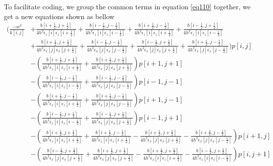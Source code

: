 \documentclass[revised,endfloat]{geophysics}
\begin{document}
To facilitate coding, we group the common terms in equation \ref{eq110} together, we get a new equations shown as bellow
\begin{equation}
\begin{split}
(\frac{-w^2}{k[i,j]} &+ \frac{b[i+\frac{1}{2}, j+\frac{1}{2}]}{4h^2 \epsilon_z[i] \epsilon_z[i+\frac{1}{2}]} + \frac{b[i-\frac{1}{2}, j-\frac{1}{2}]}{4h^2 \epsilon_z[i] \epsilon_z[i-\frac{1}{2}]} + \frac{b[i+\frac{1}{2}, j-\frac{1}{2}]}{4h^2 \epsilon_z[i] \epsilon_z[i+\frac{1}{2}]} + \frac{b[i-\frac{1}{2}, j+\frac{1}{2}]}{4h^2 \epsilon_z[i] \epsilon_z[i-\frac{1}{2}]} \\
                          &+ \frac{b[i+\frac{1}{2}, j+\frac{1}{2}]}{4h^2 \epsilon_x[j] \epsilon_x[j+\frac{1}{2}]} + \frac{b[i-\frac{1}{2}, j-\frac{1}{2}]}{4h^2 \epsilon_x[j] \epsilon_x[j-\frac{1}{2}]} + \frac{b[i-\frac{1}{2}, j+\frac{1}{2}]}{4h^2 \epsilon_x[j] \epsilon_x[j+\frac{1}{2}]} + \frac{b[i+\frac{1}{2}, j-\frac{1}{2}]}{4h^2 \epsilon_x[j] \epsilon_x[j-\frac{1}{2}]} ) p[i,j] \\
                          &- (\frac{b[i+\frac{1}{2}, j+\frac{1}{2}]}{4h^2 \epsilon_z[i] \epsilon_z[i+\frac{1}{2}]} + \frac{b[i+\frac{1}{2}, j+\frac{1}{2}]}{4h^2 \epsilon_x[j] \epsilon_x[j+\frac{1}{2}]}) p[i+1,j+1] \\
                          &- (\frac{b[i-\frac{1}{2}, j-\frac{1}{2}]}{4h^2 \epsilon_z[i] \epsilon_z[i-\frac{1}{2}]} + \frac{b[i-\frac{1}{2}, j-\frac{1}{2}]}{4h^2 \epsilon_x[j] \epsilon_x[j-\frac{1}{2}]})p[i-1,j-1]  \\
                          &- (\frac{b[i+\frac{1}{2}, j-\frac{1}{2}]}{4h^2 \epsilon_z[i] \epsilon_z[i+\frac{1}{2}]} + \frac{b[i+\frac{1}{2}, j-\frac{1}{2}]}{4h^2 \epsilon_x[j] \epsilon_x[j-\frac{1}{2}]})p[i+1,j-1] \\
                          &- (\frac{b[i-\frac{1}{2}, j+\frac{1}{2}]}{4h^2 \epsilon_z[i] \epsilon_z[i-\frac{1}{2}]} + \frac{b[i-\frac{1}{2}, j+\frac{1}{2}]}{4h^2 \epsilon_x[j] \epsilon_x[j+\frac{1}{2}]})p[i-1,j+1] \\
                          &-(\frac{b[i+\frac{1}{2}, j+\frac{1}{2}]}{4h^2 \epsilon_z[i] \epsilon_z[i+\frac{1}{2}]} +\frac{b[i+\frac{1}{2}, j-\frac{1}{2}]}{4h^2 \epsilon_z[i] \epsilon_z[i+\frac{1}{2}]} -\frac{b[i+\frac{1}{2}, j+\frac{1}{2}]}{4h^2 \epsilon_x[j] \epsilon_x[j+\frac{1}{2}]} -\frac{b[i+\frac{1}{2}, j-\frac{1}{2}]}{4h^2 \epsilon_x[j] \epsilon_x[j-\frac{1}{2}]} )p[i+1,j]  \\
                          &-(\frac{b[i-\frac{1}{2}, j+\frac{1}{2}]}{4h^2 \epsilon_x[j] \epsilon_x[j+\frac{1}{2}]} + \frac{b[i+\frac{1}{2}, j+\frac{1}{2}]}{4h^2 \epsilon_x[j] \epsilon_x[j+\frac{1}{2}]} - \frac{b[i+\frac{1}{2}, j+\frac{1}{2}]}{4h^2 \epsilon_z[i] \epsilon_z[i+\frac{1}{2}]} - \frac{b[i-\frac{1}{2}, j+\frac{1}{2}]}{4h^2 \epsilon_z[i] \epsilon_z[i-\frac{1}{2}]} )p[i,j+1] \\

\end{split}
\end{equation}
\end{document}
